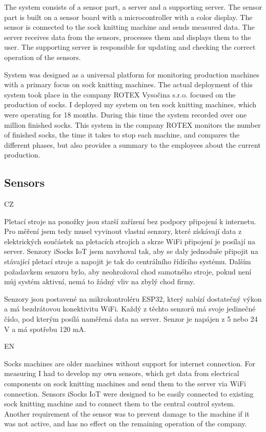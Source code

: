 \documentclass[12pt, a4paper]{article}
\begin{document}
The system consists of a sensor part, a server and a supporting server.
The sensor part is built on a sensor board with a microcontroller with a color display.
The sensor is connected to the sock knitting machine and sends measured data.
The server receives data from the sensors, processes them and displays them to the user.
The supporting server is responsible for updating and checking the correct operation of the sensors.

System was designed as a universal platform for monitoring production machines with a primary focus on sock knitting machines.
The actual deployment of this system took place in the company ROTEX Vysočina s.r.o. focused on the production of socks.
I deployed my system on ten sock knitting machines, which were operating for 18 months.
During this time the system recorded over one million finished socks.
This system in the company ROTEX monitors the number of finished socks, the time it takes to stop each machine, and compares the different phases, but also provides a summary to the employees about the current production.


\subsection*{Sensors}
CZ

Pletací stroje na ponožky jsou starší zařízení bez podpory připojení k internetu.
Pro měření jsem tedy musel vyvinout vlastní  senzory, které získávají data z elektrických součástek na pletacích  strojích a skrze WiFi připojení je posílají  na server.
Senzory iSocks IoT jsem navrhoval tak, aby se daly jednoduše připojit na stávající pletací stroje a napojit je tak do centrálního řídícího systému.
Dalším požadavkem senzoru bylo, aby neohrožoval chod samotného stroje, pokud není můj systém aktivní, nemá to žádný vliv na zbylý chod firmy.

Senzory jsou postavené na mikrokontroléru ESP32, který nabízí dostatečný výkon a má bezdrátovou konektivitu WiFi.
Každý z těchto senzorů má svoje jedinečné číslo, pod kterým posílá naměřená data na server.
Senzor je napájen z 5 nebo 24 V a má spotřebu 120 mA.

EN

Socks machines are older machines without support for internet connection.
For measuring I had to develop my own sensors, which get data from electrical components on sock knitting machines and send them to the server via WiFi connection.
Sensors iSocks IoT were designed to be easily connected to existing sock knitting machine and to connect them to the central control system.
Another requirement of the sensor was to prevent damage to the machine if it was not active, and has no effect on the remaining operation of the company.
\end{document}
